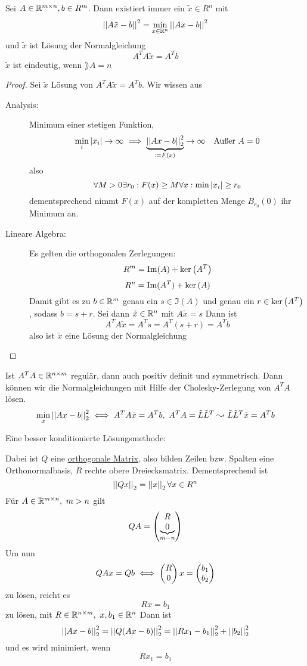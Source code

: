 \documentclass[../Skript.tex]{subfiles}
\begin{document}

{
\def\tx{\ensuremath{\tilde{x}}}
\begin{theorem}
    Sei $A\in \Rnm{m}{n}, b\in R^m$. Dann existiert immer ein $\tilde{x}\in R^n$ mit \[
        \dabs{A\tx - b}^2 = \min_{x\in\R^n}\dabs{Ax-b}^2\]
    und $\tx$ ist Lösung der Normalgleichung\[
        A^TA\tx = A^T b\]
    $\tx$ ist eindeutig, wenn $\rang{A} = n$
\end{theorem}
\begin{proof}
    Sei $\tx$ Lösung von $A^TA\tx = A^T b$. Wir wissen aus \begin{description}
        \item[Analysis:] Minimum einer stetigen Funktion, \[\min_i \left\vert x_i \right\vert \to \infty
        \implies \underbrace{\left\vert\left\vert Ax - b\right\vert\right\vert^2_2}_{\coloneqq F(x)} \to \infty \hspace{1em} \text{Außer $A = 0$}\]
        also \[
            \forall M > 0 \exists r_0: F(x) \geq M\forall x: \min\left\vert x_i \right\vert \geq r_0\]
        dementsprechend nimmt $F(x)$ auf der kompletten Menge $B_{r_0}(0)$ ihr Minimum an. 
        \item[Lineare Algebra:] Es gelten die orthogonalen Zerlegungen:\[
            R^m = \operatorname{Im}(A) + \operatorname{ker}\left(A^T\right)\]
            \[
            R^n = \operatorname{Im}(A^T) + \operatorname{ker}\left(A\right)\]
            Damit gibt es zu $b\in \mathbb{R}^m$ genau ein $s\in \Im(A)$ und genau ein $r\in \operatorname{ker}\left(A^T\right)$, sodass $b=s+r$.
            Sei dann $\tx \in \R^n$ mit $A\tx = s$ Dann ist \[
                A^T A\tx = A^T s = A^T(s+r) = A^T b\]
            also ist $\tx$ eine Lösung der Normalgleichung
    \end{description}
\end{proof}
Ist $A^TA\in \Rnm{}{}$ regulär, dann auch positiv definit und symmetrisch. Dann 
können wir die Normalgleichungen mit Hilfe der Cholesky-Zerlegung von $A^T A$ lösen.
\[
    \min_x \dabs{Ax-b}^2_2 \iff A^TA\tx = A^T b, \ A^T A  = \tilde{L}\tilde{L}^T \leadsto 
    \tilde{L} \tilde{L}^T\tx = A^T b\] 
}
Eine besser konditionierte Lösungsmethode:\begin{remark}
    Dabei ist $Q$ eine \underline{orthogonale Matrix}, also bilden Zeilen bzw. Spalten eine
    Orthonormalbasis, $R$ rechte obere Dreiecksmatrix. Dementsprechend ist \[
        \left\vert\left\vert Qx\right\vert\right\vert_2 = \left\vert\left\vert x\right\vert\right\vert_2 \forall x\in R^n\]
    Für $A\in\Rnm{m}{n}, \ m > n$ gilt \[
        QA = \begin{pmatrix}R\\\underbrace{0}_{m-n}\end{pmatrix}\]
    Um nun \[QAx = Qb \iff \begin{pmatrix}R\\0\end{pmatrix} x = \begin{pmatrix}b_1\\b_2\end{pmatrix} \]
    zu lösen, reicht es \[
        Rx=b_1\]
    zu lösen, mit $R\in \Rnm{}{}, \ x,b_1\in \R^n$
    Dann ist \[
        \left\vert\left\vert Ax-b\right\vert\right\vert_2^2 = \left\vert\left\vert Q(Ax-b)\right\vert\right\vert^2_2 = \left\vert\left\vert Rx_1-b_1\right\vert\right\vert_2^2 + \left\vert\left\vert b_2\right\vert\right\vert_2^2\]
    und es wird minimiert, wenn \[
        Rx_1 = b_1\]
\end{remark}
\end{document}
